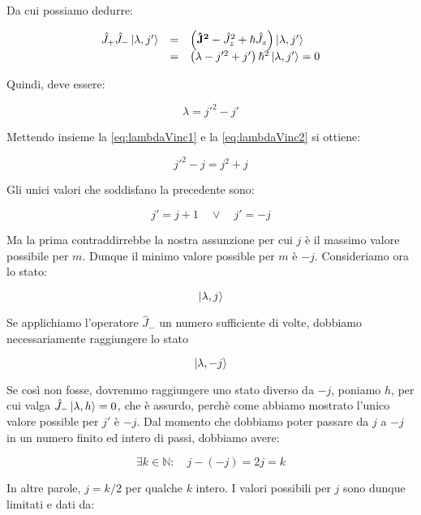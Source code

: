 Da cui possiamo dedurre:

	\begin{equation}
		\begin{array}{c c l}
			\hat{J}_+ \hat{J}_- \ket{\lambda, j'} & = & \left ( \mathbf{\hat{J}^2} - \hat{J}_z^2 + \hbar \hat{J}_z \right ) \ket{\lambda, j'}\\

		& = & \left ( \lambda - j'^2 + j' \right ) \hbar^2 \ket{\lambda, j'} = 0
		\end{array}
	\end{equation}

Quindi, deve essere:

	\begin{equation} \label{eq:lambdaVinc2}
		\lambda  = j'^2 - j'
	\end{equation}

Mettendo insieme la \eqref{eq:lambdaVinc1} e la \eqref{eq:lambdaVinc2} si ottiene:

	\begin{equation}
		j'^2 - j = j^2 + j
	\end {equation}

Gli unici valori che soddisfano la precedente sono:

	\[
		j' = j + 1 \quad \vee \quad j' = -j
	\]

Ma la prima contraddirrebbe la nostra assunzione per cui $j$ \`e il massimo valore possibile per $m$. Dunque il minimo valore possible per $m$ \`e $-j$. Consideriamo ora lo stato:

	\[
		\ket{\lambda, j}
	\]

Se applichiamo l'operatore $\hat{J}_-$ un numero sufficiente di volte, dobbiamo necessariamente raggiungere lo stato

	\[
		\ket{\lambda, -j}
	\]

Se cos\`i non fosse, dovremmo raggiungere uno stato diverso da $-j$, poniamo $h$, per cui valga $\hat{J}_- \ket{\lambda, h} = 0$, che \`e assurdo, perch\`e come abbiamo mostrato l'unico valore possible per $j'$ \`e $-j$. Dal momento che dobbiamo poter passare da $j$ a $-j$ in un numero finito ed intero di passi, dobbiamo avere:

	\begin{equation}
		\exists k \in \mathbb{N} : \quad j - (- j) = 2j = k
	\end{equation}

In altre parole, $j = k/2$ per qualche $k$ intero. I valori possibili per $j$ sono dunque limitati e dati da:

